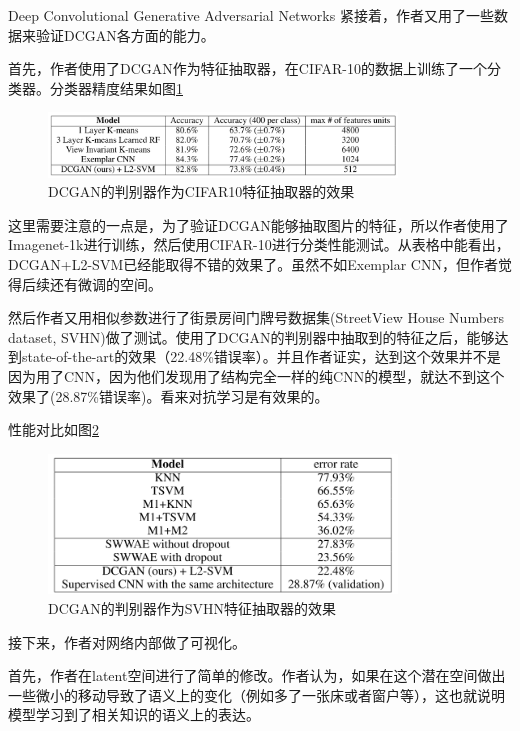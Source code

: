 \documentclass{ctexart}
\begin{document}
\begin{section}{Deep Convolutional Generative Adversarial Networks}
		紧接着，作者又用了一些数据来验证DCGAN各方面的能力。
		
		首先，作者使用了DCGAN作为特征抽取器，在CIFAR-10的数据上训练了一个分类器。分类器精度结果如图\ref{fig:dcgan-dis-cifar-fe}
		
		\begin{figure}
			\centering
			\includegraphics[width=25em]{figures/DCGAN-discriminator-feature-extractor-cifar-10.png}
			\caption{DCGAN的判别器作为CIFAR10特征抽取器的效果}
			\label{fig:dcgan-dis-cifar-fe}
		\end{figure}
	
		这里需要注意的一点是，为了验证DCGAN能够抽取图片的特征，所以作者使用了Imagenet-1k进行训练，然后使用CIFAR-10进行分类性能测试。从表格中能看出，DCGAN+L2-SVM已经能取得不错的效果了。虽然不如Exemplar CNN，但作者觉得后续还有微调的空间。
		
		然后作者又用相似参数进行了街景房间门牌号数据集(StreetView House Numbers dataset, SVHN)做了测试。使用了DCGAN的判别器中抽取到的特征之后，能够达到state-of-the-art的效果（22.48\%错误率）。并且作者证实，达到这个效果并不是因为用了CNN，因为他们发现用了结构完全一样的纯CNN的模型，就达不到这个效果了(28.87\%错误率)。看来对抗学习是有效果的。
		
		性能对比如图\ref{fig:dcgan-dis-svhn-fe}
		
		\begin{figure}
			\centering
			\includegraphics[width=25em]{figures/DCGAN-discriminator-feature-extractor-svhn.png}
			\caption{DCGAN的判别器作为SVHN特征抽取器的效果}
			\label{fig:dcgan-dis-svhn-fe}
		\end{figure}
	
		接下来，作者对网络内部做了可视化。
		
		首先，作者在latent空间进行了简单的修改。作者认为，如果在这个潜在空间做出一些微小的移动导致了语义上的变化（例如多了一张床或者窗户等），这也就说明模型学习到了相关知识的语义上的表达。
		

\end{section}
\end{document}
